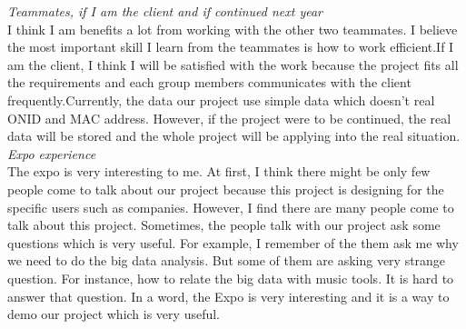 \noindent\textit{Teammates, if I am the client and if continued next year}\\
I think I am benefits a lot from working with the other two teammates. I believe the most important skill I learn from the teammates is how to work efficient.If I am the client, I think I will be satisfied with the work because the project fits all the requirements and each group members communicates with the client frequently.Currently, the data our project use simple data which doesn’t real ONID and MAC address. However, if the project were to be continued, the real data will be stored and the whole project will be applying into the real situation.\\

\noindent\textit{Expo experience}\\
The expo is very interesting to me. At first, I think there might be only few people come to talk about our project because this project is designing for the specific users such as companies. However, I find there are many people come to talk about this project. Sometimes, the people talk with our project ask some questions which is very useful. For example, I remember of the them ask me why we need to do the big data analysis. But some of them are asking very strange question. For instance, how to relate the big data with music tools. It is hard to answer that question. In a word, the Expo is very interesting and it is a way to demo our project which is very useful.
